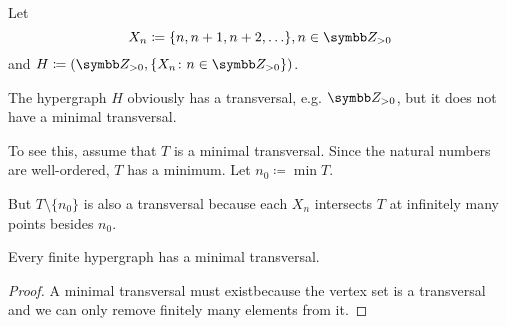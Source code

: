\begin{example}\label{ex:no_minimal_set_transversal}
  Let
  \begin{equation*}
    X_n \coloneqq \{ n, n + 1, n + 2, \ldots \}, n \in \Z_{>0}
  \end{equation*}
  and \( H \coloneqq (\Z_{>0}, \{ X_n \colon n \in \Z_{>0} \}) \).

  The hypergraph \( H \) obviously has a transversal, e.g. \( \Z_{>0} \), but it does not have a minimal transversal.

  To see this, assume that \( T \) is a minimal transversal. Since the natural numbers are well-ordered, \( T \) has a minimum. Let \( n_0 \coloneqq \min T \).

  But \( T \setminus \{ n_0 \} \) is also a transversal because each \( X_n \) intersects \( T \) at infinitely many points besides \( n_0 \).
\end{example}

\begin{proposition}\label{thm:finite_hypergraphs_have_minimal_transversal}
  Every finite hypergraph has a minimal transversal.
\end{proposition}
\begin{proof}
  A minimal transversal must exist\LEM because the vertex set is a transversal and we can only remove finitely many elements from it.
\end{proof}
